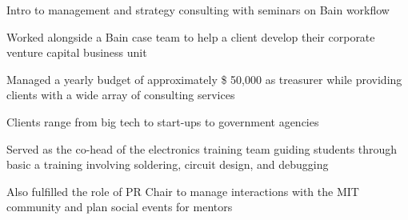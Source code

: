 \documentclass[letterpaper, article]{deedy-resume-openfont}
\begin{document}
\begin{minipage}[t]{0.66\textwidth}
\begin{tightemize}
	\item Intro to management and strategy consulting with seminars on Bain workflow
	\item Worked alongside a Bain case team to help a client develop their corporate venture capital business unit
\end{tightemize}
\sectionsep

\begin{tightemize}
	\item Managed a yearly budget of approximately \$ 50,000 as treasurer while providing clients with a wide array of consulting services
	\item Clients range from big tech to start-ups to government agencies
\end{tightemize}
\sectionsep


\begin{tightemize}
	\item Served as the co-head of the electronics training team guiding students through basic a training involving soldering, circuit design, and debugging
	\item Also fulfilled the role of PR Chair to manage interactions with the MIT community and plan social events for mentors
\end{tightemize}



\end{minipage}
\end{document}
